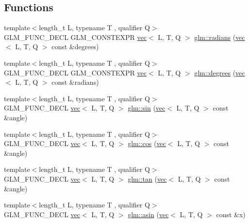\subsection*{Functions}
\begin{DoxyCompactItemize}
\item 
{\footnotesize template$<$length\+\_\+t L, typename T , qualifier Q$>$ }\\G\+L\+M\+\_\+\+F\+U\+N\+C\+\_\+\+D\+E\+CL G\+L\+M\+\_\+\+C\+O\+N\+S\+T\+E\+X\+PR \hyperlink{structglm_1_1vec}{vec}$<$ L, T, Q $>$ \hyperlink{group__core__func__trigonometric_ga6e1db4862c5e25afd553930e2fdd6a68}{glm\+::radians} (\hyperlink{structglm_1_1vec}{vec}$<$ L, T, Q $>$ const \&degrees)
\item 
{\footnotesize template$<$length\+\_\+t L, typename T , qualifier Q$>$ }\\G\+L\+M\+\_\+\+F\+U\+N\+C\+\_\+\+D\+E\+CL G\+L\+M\+\_\+\+C\+O\+N\+S\+T\+E\+X\+PR \hyperlink{structglm_1_1vec}{vec}$<$ L, T, Q $>$ \hyperlink{group__core__func__trigonometric_ga8faec9e303538065911ba8b3caf7326b}{glm\+::degrees} (\hyperlink{structglm_1_1vec}{vec}$<$ L, T, Q $>$ const \&radians)
\item 
{\footnotesize template$<$length\+\_\+t L, typename T , qualifier Q$>$ }\\G\+L\+M\+\_\+\+F\+U\+N\+C\+\_\+\+D\+E\+CL \hyperlink{structglm_1_1vec}{vec}$<$ L, T, Q $>$ \hyperlink{group__core__func__trigonometric_ga29747fd108cb7292ae5a284f69691a69}{glm\+::sin} (\hyperlink{structglm_1_1vec}{vec}$<$ L, T, Q $>$ const \&angle)
\item 
{\footnotesize template$<$length\+\_\+t L, typename T , qualifier Q$>$ }\\G\+L\+M\+\_\+\+F\+U\+N\+C\+\_\+\+D\+E\+CL \hyperlink{structglm_1_1vec}{vec}$<$ L, T, Q $>$ \hyperlink{group__core__func__trigonometric_ga6a41efc740e3b3c937447d3a6284130e}{glm\+::cos} (\hyperlink{structglm_1_1vec}{vec}$<$ L, T, Q $>$ const \&angle)
\item 
{\footnotesize template$<$length\+\_\+t L, typename T , qualifier Q$>$ }\\G\+L\+M\+\_\+\+F\+U\+N\+C\+\_\+\+D\+E\+CL \hyperlink{structglm_1_1vec}{vec}$<$ L, T, Q $>$ \hyperlink{group__core__func__trigonometric_ga293a34cfb9f0115cc606b4a97c84f11f}{glm\+::tan} (\hyperlink{structglm_1_1vec}{vec}$<$ L, T, Q $>$ const \&angle)
\item 
{\footnotesize template$<$length\+\_\+t L, typename T , qualifier Q$>$ }\\G\+L\+M\+\_\+\+F\+U\+N\+C\+\_\+\+D\+E\+CL \hyperlink{structglm_1_1vec}{vec}$<$ L, T, Q $>$ \hyperlink{group__core__func__trigonometric_ga0552d2df4865fa8c3d7cfc3ec2caac73}{glm\+::asin} (\hyperlink{structglm_1_1vec}{vec}$<$ L, T, Q $>$ const \&x)

\end{DoxyCompactItemize}
